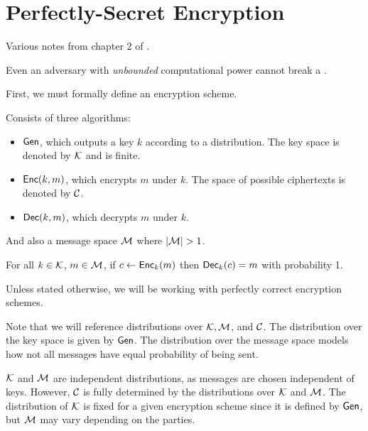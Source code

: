 \section{Perfectly-Secret Encryption}
\label{perfectly-secret}

Various notes from chapter 2 of \cite{katz-lindell}.

\begin{definition}
    Even an adversary with \textit{unbounded} computational power cannot break a .
\end{definition}

First, we must formally define an encryption scheme.
\begin{definition}
    Consists of three algorithms:
    \begin{itemize}
        \item $\operatorname{\mathsf{Gen}}$, which outputs a key $k$ according to a distribution. The key space is denoted by $\mathcal K$ and is finite.
        \item $\operatorname{\mathsf{Enc}}(k, m)$, which encrypts $m$ under $k$. The space of possible ciphertexts is denoted by $\mathcal C$.
        \item $\operatorname{\mathsf{Dec}}(k, m)$, which decrypts $m$ under $k$.
    \end{itemize}
    And also a message space $\mathcal M$ where $|\mathcal M| > 1$.
\end{definition}

\begin{definition}
    For all $k \in \mathcal K$, $m \in \mathcal M$, if $c \leftarrow \operatorname{\mathsf{Enc}}_k(m)$ then $\operatorname{\mathsf{Dec}}_k(c) = m$ with probability 1.        

    Unless stated otherwise, we will be working with perfectly correct encryption schemes.
\end{definition}

Note that we will reference distributions over $\mathcal K, \mathcal M$, and $\mathcal C$. The distribution over the key space is given by $\operatorname{\mathsf{Gen}}$. The distribution over the message space models how not all messages have equal probability of being sent.

$\mathcal K$ and $\mathcal M$ are independent distributions, as messages are chosen independent of keys. However, $\mathcal C$ is fully determined by the distributions over $\mathcal K$ and $\mathcal M$. The distribution of $\mathcal K$ is fixed for a given encryption scheme since it is defined by $\operatorname{\mathsf{Gen}}$, but $\mathcal M$ may vary depending on the parties. 

